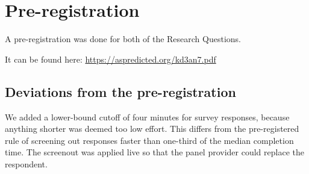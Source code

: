 \section{Pre-registration}

A pre-registration was done for both of the Research Questions.

It can be found here: \url{https://aspredicted.org/kd3an7.pdf} \cite{thompsonPreregistrationAligningLLMs2026/10/1515:17}

\subsection{Deviations from the pre-registration}

We added a lower-bound cutoff of four minutes for survey responses, because anything shorter was deemed too low effort. This differs from the pre-registered rule of screening out responses faster than one-third of the median completion time. The screenout was applied live so that the panel provider could replace the respondent.
